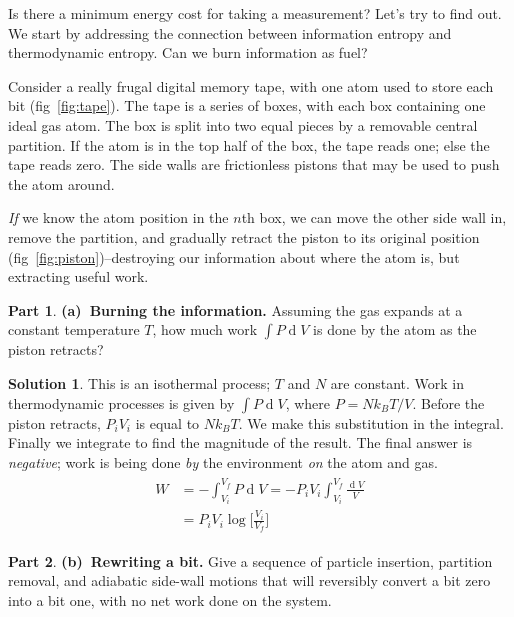 \documentclass[11pt]{article}
\renewcommand{\d}[1]{\ensuremath{\operatorname{d}\!{#1}}}
\theoremstyle{definition}
\newtheorem{question}{Part}[section]
\newtheorem*{solution}{Solution}
\numberwithin{equation}{section}
\numberwithin{figure}{section}
\begin{document}
Is there a minimum energy cost for taking a measurement? Let's try to find out. We start by addressing the connection between information entropy and thermodynamic entropy. Can we burn information as fuel?

Consider a really frugal digital memory tape, with one atom used to store each bit (fig~\ref{fig:tape}). The tape is a series of boxes, with each box containing one ideal gas atom. The box is split into two equal pieces by a removable central partition. If the atom is in the top half of the box, the tape reads one; else the tape reads zero. The side walls are frictionless pistons that may be used to push the atom around.

\emph{If} we know the atom position in the $n$th box, we can move the other side wall in, remove the partition, and gradually retract the piston to its original position (fig~\ref{fig:piston})--destroying our information about where the atom is, but extracting useful work.

\begin{question}
\textbf{(a)~Burning the information.} Assuming the gas expands at a constant temperature $T$, how much work $\int P\d{V}$ is done by the atom as the piston retracts?
\end{question}

\begin{solution}
This is an isothermal process; $T$ and $N$ are constant. Work in thermodynamic processes is given by $\int P\d{V}$, where $P = Nk_BT/V$. Before the piston retracts, $P_iV_i$ is equal to $Nk_BT$. We make this substitution in the integral. Finally we integrate to find the magnitude of the result. The final answer is \emph{negative}; work is being done \emph{by} the environment \emph{on} the atom and gas.
\begin{align}
\begin{aligned}
W& = - \int_{V_i}^{V_f} P \d{V}
= - P_iV_i \int_{V_i}^{V_f} \frac{\d{V}}{V}
\\
& = \boxed{P_iV_i \log \! \Bigg[ \frac{V_i}{V_f} \Bigg]}\label{eq:work}
\end{aligned}
\end{align}
\end{solution}

\newpage
\begin{question}
\textbf{(b)~Rewriting a bit.} Give a sequence of particle insertion, partition removal, and adiabatic side-wall motions that will reversibly convert a bit zero into a bit one, with no net work done on the system.
\end{question}
\end{document}
